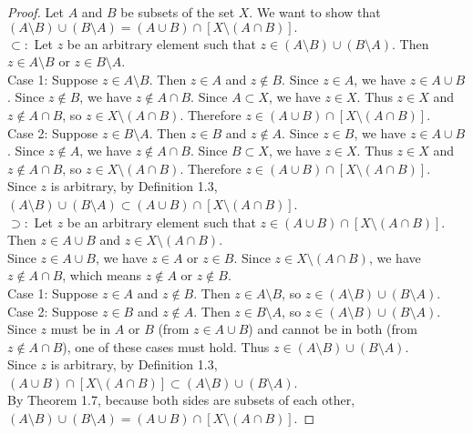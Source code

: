 \documentclass[11pt]{article}
\begin{document}
\begin{proof}
Let $A$ and $B$ be subsets of the set $X$. We want to show that $(A\setminus B)\cup (B\setminus A)=(A\cup B)\cap [X\setminus(A\cap B)].$ \\
$\subset:$ Let $z$ be an arbitrary element such that $z \in (A\setminus B)\cup (B\setminus A)$. Then $z \in A\setminus B$ or $z \in B\setminus A$. \\
Case 1: Suppose $z \in A\setminus B$. Then $z \in A$ and $z \notin B$. Since $z \in A$, we have $z \in A \cup B$. Since $z \notin B$, we have $z \notin A \cap B$. Since $A \subset X$, we have $z \in X$. Thus $z \in X$ and $z \notin A \cap B$, so $z \in X\setminus(A\cap B)$. Therefore $z \in (A\cup B)\cap [X\setminus(A\cap B)]$. \\
Case 2: Suppose $z \in B\setminus A$. Then $z \in B$ and $z \notin A$. Since $z \in B$, we have $z \in A \cup B$. Since $z \notin A$, we have $z \notin A \cap B$. Since $B \subset X$, we have $z \in X$. Thus $z \in X$ and $z \notin A \cap B$, so $z \in X\setminus(A\cap B)$. Therefore $z \in (A\cup B)\cap [X\setminus(A\cap B)]$. \\
Since $z$ is arbitrary, by Definition 1.3, $(A\setminus B)\cup (B\setminus A) \subset (A\cup B)\cap [X\setminus(A\cap B)]$. \\
$\supset:$ Let $z$ be an arbitrary element such that $z \in (A\cup B)\cap [X\setminus(A\cap B)]$. Then $z \in A\cup B$ and $z \in X\setminus(A\cap B)$. \\
Since $z \in A\cup B$, we have $z \in A$ or $z \in B$. Since $z \in X\setminus(A\cap B)$, we have $z \notin A\cap B$, which means $z \notin A$ or $z \notin B$. \\
Case 1: Suppose $z \in A$ and $z \notin B$. Then $z \in A\setminus B$, so $z \in (A\setminus B)\cup (B\setminus A)$. \\
Case 2: Suppose $z \in B$ and $z \notin A$. Then $z \in B\setminus A$, so $z \in (A\setminus B)\cup (B\setminus A)$. \\
Since $z$ must be in $A$ or $B$ (from $z \in A\cup B$) and cannot be in both (from $z \notin A\cap B$), one of these cases must hold. Thus $z \in (A\setminus B)\cup (B\setminus A)$. \\
Since $z$ is arbitrary, by Definition 1.3, $(A\cup B)\cap [X\setminus(A\cap B)] \subset (A\setminus B)\cup (B\setminus A)$. \\
By Theorem 1.7, because both sides are subsets of each other, $(A\setminus B)\cup (B\setminus A)=(A\cup B)\cap [X\setminus(A\cap B)]$.
\end{proof}
\end{document}
